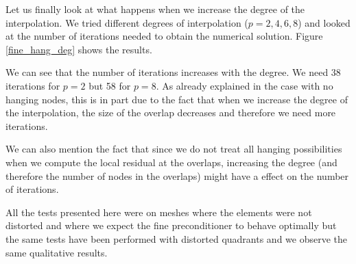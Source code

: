 Let us finally look at what happens when we increase the degree of the interpolation. We tried different degrees of interpolation ($p=2,4,6,8$) and looked at the number of iterations needed to obtain the numerical solution. Figure \ref{fine_hang_deg} shows the results.  

We can see that the number of iterations increases with the degree. We need 38 iterations for $p=2$ but 58 for $p=8$. As already explained in the case with no hanging nodes, this is in part due to the fact that when we increase the degree of the interpolation, the size of the overlap decreases and therefore we need more iterations.

We can also mention the fact that since we do not treat all hanging possibilities when we compute the local residual at the overlaps, increasing the degree (and therefore the number of nodes in the overlaps) might have a effect on the number of iterations.

All the tests presented here were on meshes where the elements were not distorted and where we expect the fine preconditioner to behave optimally but the same tests have been performed with distorted quadrants and we observe the same qualitative results. 


 



 
